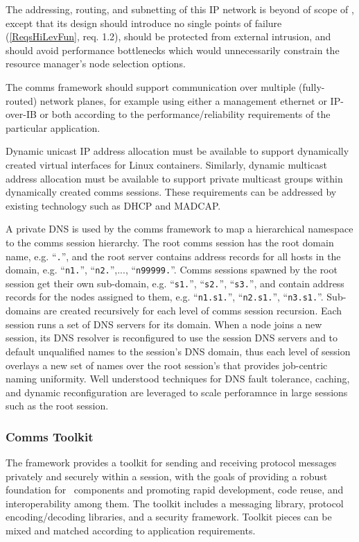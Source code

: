 The addressing, routing, and subnetting of this IP network is beyond of
scope of \ngrm, except that its design should introduce no single
points of failure (\ref{ReqsHiLevFun}, req. 1.2), should be protected
from external intrusion, and should avoid performance bottlenecks which
would unnecessarily constrain the resource manager's node selection options.

The comms framework should support communication over multiple
(fully-routed) network planes, for example using either a management
ethernet or IP-over-IB or both according to the performance/reliability
requirements of the particular application.

Dynamic unicast IP address allocation must be available to support
dynamically created virtual interfaces for Linux containers.  Similarly,
dynamic multicast address allocation must be available to support
private multicast groups within dynamically created comms sessions.
These requirements can be addressed by existing technology such as
DHCP\cite{rfc2131} and MADCAP\cite{rfc2730}.

A private DNS\cite{rfc1034}\cite{rfc1035} is used by the comms framework to
map a hierarchical namespace to the comms session hierarchy.
The root comms session has the root domain name, e.g. ``{\tt \ngrm.}'',
and the root server contains address records for all hosts in the domain, e.g.
``{\tt n1.\ngrm}'', ``{\tt n2.\ngrm}'',..., ``{\tt n99999.\ngrm}''.
Comms sessions spawned by the root session get their own sub-domain, e.g.
``{\tt s1.\ngrm}'', ``{\tt s2.\ngrm}'', ``{\tt s3.\ngrm}'',
and contain address records for the nodes assigned to them, e.g.
``{\tt n1.s1.\ngrm}'', ``{\tt n2.s1.\ngrm}'', ``{\tt n3.s1.\ngrm}''.
Sub-domains are created recursively for each level of comms session
recursion.  Each session runs a set of DNS servers for its domain.
When a node joins a new session, its DNS resolver is reconfigured to use
the session DNS servers and to default unqualified names to the session's
DNS domain, thus each level of session overlays a new set of names over
the root session's that provides job-centric naming uniformity.
Well understood techniques for DNS fault tolerance,
caching, and dynamic reconfiguration are leveraged to scale perforamnce
in large sessions such as the root session.


\subsubsection{Comms Toolkit}

The framework provides a toolkit for sending and receiving
protocol messages privately and securely within a session,
with the goals of providing a robust foundation for \ngrm\ components
and promoting rapid development, code reuse, and interoperability
among them.  The toolkit includes a messaging library,
protocol encoding/decoding libraries, and a security framework.
Toolkit pieces can be mixed and matched according to application requirements.

